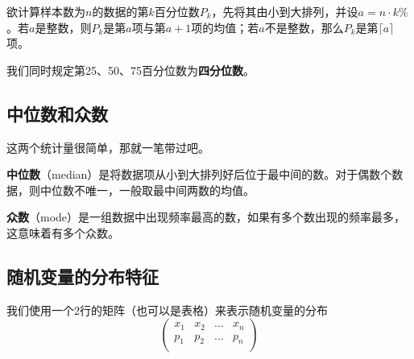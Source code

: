 欲计算样本数为$n$的数据的第$k$百分位数$P_k$，先将其由小到大排列，并设$a=n\cdot k\%$。若$a$是整数，则$P_k$是第$a$项与第$a+1$项的均值；若$a$不是整数，那么$P_k$是第$\lceil a\rceil$项。

我们同时规定第25、50、75百分位数为\textbf{四分位数}。

\subsection{中位数和众数}
这两个统计量很简单，那就一笔带过吧。

\textbf{中位数}（median）是将数据项从小到大排列好后位于最中间的数。对于偶数个数据，则中位数不唯一，一般取最中间两数的均值。

\textbf{众数}（mode）是一组数据中出现频率最高的数，如果有多个数出现的频率最多，这意味着有多个众数。

\subsection{随机变量的分布特征}
我们使用一个2行的矩阵（也可以是表格）来表示随机变量的分布
\[\left(
	\begin{array}{cccc}
		x_1 & x_2 & \ldots & x_n \\
		p_1 & p_2 & \ldots & p_n \\
	\end{array}
\right)\]
